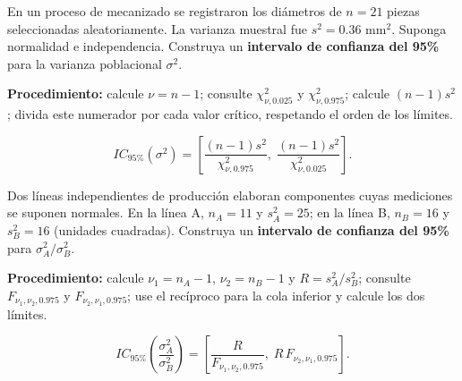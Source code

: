 \documentclass[
  spanish,
  12pt,
  letterpaper]{article}
\begin{document}
\par\vspace{3pt}

En un proceso de mecanizado se registraron los diámetros de \(n=21\)
piezas seleccionadas aleatoriamente. La varianza muestral fue
\(s^2=0.36\) mm\(^2\). Suponga normalidad e independencia. Construya un
\textbf{intervalo de confianza del 95\%} para la varianza poblacional
\(\sigma^2\).

\textbf{Procedimiento:} calcule \(\nu=n-1\); consulte
\(\chi^2_{\nu,0.025}\) y \(\chi^2_{\nu,0.975}\); calcule \((n-1)s^2\);
divida este numerador por cada valor crítico, respetando el orden de los
límites.

\[IC_{95\%}(\sigma^2)=\left[\frac{(n-1)s^2}{\chi^2_{\nu,0.975}},\;\frac{(n-1)s^2}{\chi^2_{\nu,0.025}}\right].\]

\par\vspace{3pt}

Dos líneas independientes de producción elaboran componentes cuyas
mediciones se suponen normales. En la línea A, \(n_A=11\) y
\(s_A^2=25\); en la línea B, \(n_B=16\) y \(s_B^2=16\) (unidades
cuadradas). Construya un \textbf{intervalo de confianza del 95\%} para
\(\sigma_A^2/\sigma_B^2\).

\textbf{Procedimiento:} calcule \(\nu_1=n_A-1\), \(\nu_2=n_B-1\) y
\(R=s_A^2/s_B^2\); consulte \(F_{\nu_1,\nu_2,0.975}\) y
\(F_{\nu_2,\nu_1,0.975}\); use el recíproco para la cola inferior y
calcule los dos límites.

\[IC_{95\%}\!\left(\frac{\sigma_A^2}{\sigma_B^2}\right)=\left[\frac{R}{F_{\nu_1,\nu_2,0.975}},\;R\,F_{\nu_2,\nu_1,0.975}\right].\]
\end{document}
